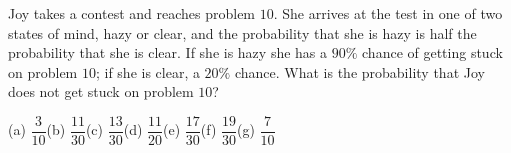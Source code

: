 Joy takes a contest and reaches problem $10$. She arrives at the test in one of two states of mind, hazy or clear, and the probability that she is hazy is half the probability that she is clear. If she is hazy she has a $90\%$ chance of getting stuck on problem $10$; if she is clear, a $20\%$ chance. What is the probability that Joy does not get stuck on problem $10$?

(a) $\dfrac{3}{10}$\quad (b) $\dfrac{11}{30}$\quad (c) $\dfrac{13}{30}$\quad (d) $\dfrac{11}{20}$\quad (e) $\dfrac{17}{30}$\quad (f) $\dfrac{19}{30}$\quad (g) $\dfrac{7}{10}$

